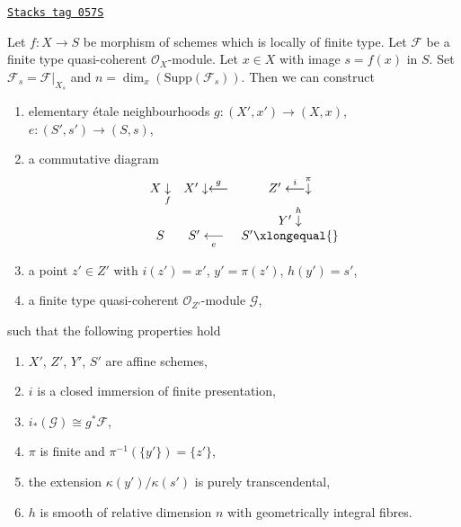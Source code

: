 \begin{lemma}
\label{flat-lemma-elementary-devissage}
\href{https://stacks.math.columbia.edu/tag/057S}{\texttt{Stacks tag 057S}}

Let $f : X \to S$ be morphism of schemes which is locally of finite type.
Let $\mathcal{F}$ be a finite type quasi-coherent $\mathcal{O}_X$-module.
Let $x \in X$ with image $s = f(x)$ in $S$.
Set $\mathcal{F}_s = \mathcal{F}|_{X_s}$ and
$n = \dim_x(\text{Supp}(\mathcal{F}_s))$.
Then we can construct
\begin{enumerate}
\item elementary \'etale neighbourhoods $g : (X', x') \to (X, x)$,
$e : (S', s') \to (S, s)$,
\item a commutative diagram
$$
\begin{array}{ccc}X \underset{f}{\downarrow} & X' \downarrow\overset{g}{\longleftarrow} & Z' \overset{i}{\longleftarrow}\overset{\pi}{\downarrow} \\  &  & Y' \overset{h}{\downarrow} \\ S & S' \underset{e}{\longleftarrow} & S' \xlongequal{}\end{array}
$$
\item a point $z' \in Z'$ with $i(z') = x'$, $y' = \pi(z')$, $h(y') = s'$,
\item a finite type quasi-coherent $\mathcal{O}_{Z'}$-module $\mathcal{G}$,
\end{enumerate}
such that the following properties hold
\begin{enumerate}
\item $X'$, $Z'$, $Y'$, $S'$ are affine schemes,
\item $i$ is a closed immersion of finite presentation,
\item $i_*(\mathcal{G}) \cong g^*\mathcal{F}$,
\item $\pi$ is finite and $\pi^{-1}(\{y'\}) = \{z'\}$,
\item the extension $\kappa(y')/\kappa(s')$ is purely transcendental,
\item $h$ is smooth of relative dimension $n$
with geometrically integral fibres.
\end{enumerate}
\end{lemma}

